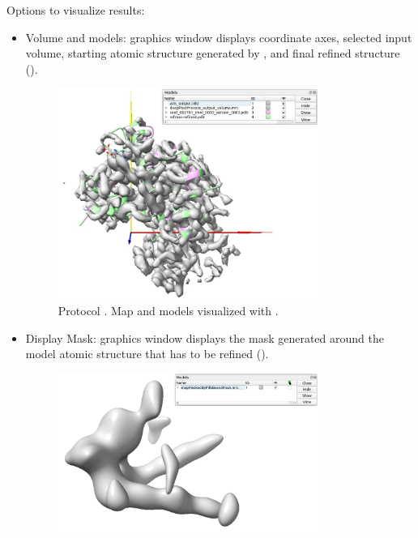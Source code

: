 \begin{itemize}
    Options to visualize  results:
    \begin{itemize}
     \item Volume and models:
     \chimera graphics window displays coordinate axes, selected input volume, starting atomic structure generated by \coot, and final  refined structure ().
        \begin{figure}[H]
         \centering 
         \captionsetup{width=.9\linewidth} 
         \includegraphics[width=0.80\textwidth]{Images_appendix/Fig128.pdf}
         \caption{Protocol . Map and models visualized with \chimera.}
         \label{fig:app_protocol_refmac_3}
        \end{figure}
     \item Display Mask:
     \chimera graphics window displays the mask generated around the model atomic structure that has to be refined ().
        \begin{figure}[H]
         \centering 
         \captionsetup{width=.9\linewidth} 
         \includegraphics[width=0.80\textwidth]{Images_appendix/Fig129.pdf}

\end{figure}
\end{itemize}
\end{itemize}
